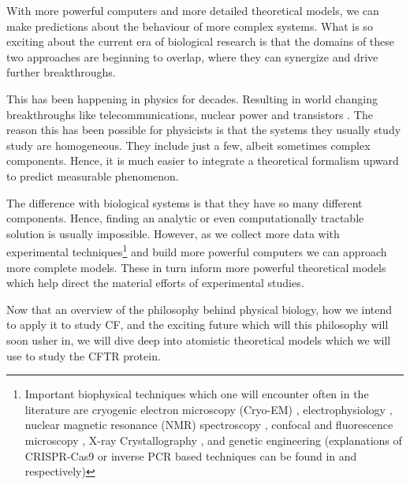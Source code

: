 With more powerful computers and more detailed theoretical models, we can make predictions about the behaviour of more complex systems. What is so exciting about the current era of biological research is that the domains of these two approaches are beginning to overlap, where they can synergize  and drive further breakthroughs\cite{anonymous2019}.

This has been happening in physics for decades. Resulting in world changing breakthroughs like telecommunications, nuclear power and transistors \cite{wu2009}. The reason this has been possible for physicists is that the systems they usually study study are homogeneous. They include just a few, albeit sometimes complex components. Hence, it is much easier to integrate a theoretical formalism upward to predict measurable phenomenon. 

The difference with biological systems is that they have so many different components. Hence, finding an analytic or even computationally tractable solution is usually impossible. However, as we collect more data with experimental techniques\footnote{Important biophysical techniques which one will encounter often in the literature are cryogenic electron microscopy (Cryo-EM) \cite{cheng2015, callaway2015, callaway2020}, electrophysiology \cite{aidley1996}, nuclear magnetic resonance (NMR) spectroscopy \cite{marion2013}, confocal and fluorescence microscopy \cite{sanderson2014}, X-ray Crystallography \cite{frauenfelder2010, drenth2006}, and genetic engineering (explanations of CRISPR-Cas9 or inverse PCR based techniques can be found in \cite{silva2017} and \cite{crispr2019} respectively)} and build more powerful computers we can approach more complete models. These in turn inform more powerful theoretical models which help direct the material efforts of experimental studies. 

Now that an overview of the philosophy behind physical biology, how we intend to apply it to study CF, and the exciting future which will this philosophy will soon usher in, we will dive deep into atomistic theoretical models which we will use to study the CFTR protein. 

